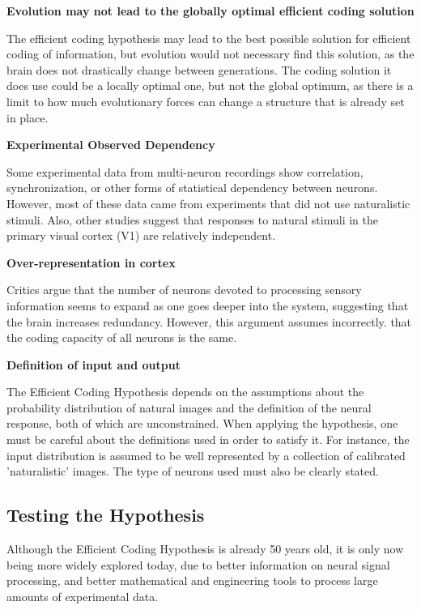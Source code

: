 \documentclass[twoside]{article}
\begin{document}
\begin{multicols}{2}
\noindent\textbf{Evolution may not lead to the globally optimal efficient coding solution}

The efficient coding hypothesis may lead to the best possible solution for efficient coding of information, but evolution would not necessary find this solution, as the brain does not drastically change between generations. The coding solution it does use could be a locally optimal one, but not the global optimum, as there is a limit to how much evolutionary forces can change a structure that is already set in place. 

\noindent\textbf{Experimental Observed Dependency}

Some experimental data from multi-neuron recordings show correlation, synchronization, or other forms of statistical dependency between neurons. However, most of these data came from experiments that did not use naturalistic stimuli. Also, other studies suggest that responses to natural stimuli in the primary visual cortex (V1) are relatively independent. 

\noindent\textbf{Over-representation in cortex}

Critics argue that the number of neurons devoted to processing sensory information seems to expand as one goes deeper into the system, suggesting that the brain increases redundancy. However, this argument assumes incorrectly. that the coding capacity of all neurons is the same. 

\noindent\textbf{Definition of input and output}

The Efficient Coding Hypothesis depends on the assumptions about the probability distribution of natural images and the definition of the neural response, both of which are unconstrained. When applying the hypothesis, one must be careful about the definitions used in order to satisfy it. For instance, the input distribution is assumed to be well represented by a collection of calibrated 'naturalistic' images. The type of neurons used must also be clearly stated.

\subsection{Testing the Hypothesis}

Although the Efficient Coding Hypothesis is already 50 years old, it is only now being more widely explored today, due to better information on neural signal processing, and better mathematical and engineering tools to process large amounts of experimental data.


\end{multicols}
\end{document}
